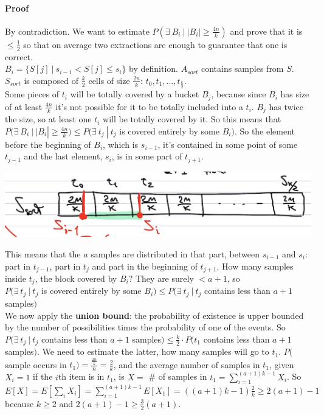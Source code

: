 \documentclass[10pt]{report}
\begin{document}
\paragraph{Proof} By contradiction. We want to estimate $P(\exists\:B_i\:|\:|B_i|\geq \frac{4n}{k})$ and prove that it is $\leq \frac{1}{2}$ so that on average two extractions are enough to guarantee that one is correct.\\
$B_i = \{S[j]\:|\: s_{i-1} < S[j] \leq s_i\}$ by definition. $A_{sort}$  contains samples from $S$.\\
$S_{sort}$ is composed of $\frac{k}{2}$ cells of size $\frac{2n}{k}$: $t_0, t_1, \ldots, t_\frac{k}{2}$.\\
Some pieces of $t_i$ will be totally covered by a bucket $B_j$, because since $B_i$ has size of at least $\frac{4n}{k}$ it's not possible for it to be totally included into a $t_i$. $B_j$ has twice the size, so at least one $t_i$ will be totally covered by it. So this means that $P(\exists\:B_i\:|\:|B_i|\geq \frac{4n}{k}) \leq P(\exists\: t_j\:|\: t_j$ is covered entirely by some $B_i)$. So the element before the beginning of $B_i$, which is $s_{i-1}$, it's contained in some point of some $t_{j-1}$ and the last element, $s_i$, is in some part of $t_{j+1}$.
\begin{center}
	\includegraphics[scale=0.75]{4.png}
\end{center}
This means that the $a$ samples are distributed in that part, between $s_{i-1}$ and $s_i$: part in $t_{j-1}$, part in $t_j$ and part in the beginning of $t_{j+1}$. How many samples inside $t_j$, the block covered by $B_i$? They are surely $< a+1$, so\\$P(\exists\: t_j\:|\: t_j$ is covered entirely by some $B_i) \leq P(\exists\:t_j\:|\:t_j$ contains less than $a+1$ samples$)$\\
We now apply the \textbf{union bound}: the probability of existence is upper bounded by the number of possibilities times the probability of one of the events. So $P(\exists\:t_j\:|\:t_j$ contains less than $a+1$ samples$) \leq \frac{k}{2}\cdot P(t_1$ contains less than $a+1$ samples$)$. We need to estimate the latter, how many samples will go to $t_1$. $P($sample occurs in $t_1) = \frac{\frac{2n}{k}}{n} = \frac{2}{k}$, and the average number of samples in $t_1$, given $X_i = 1$ if the $i$th item is in $t_1$, is $X =$ \# of samples in $t_1 = \sum_{i = 1}^{(a+1)k - 1} X_i$. So $E[X] = E[\sum_i X_i] = \sum_{i = 1}^{(a+1)k - 1} E[X_1] = ((a+1)k - 1)\frac{2}{k} \geq 2(a+1) - 1$ because $k \geq 2$ and $2(a+1) - 1 \geq \frac{3}{2}(a+1)$.
\end{document}
